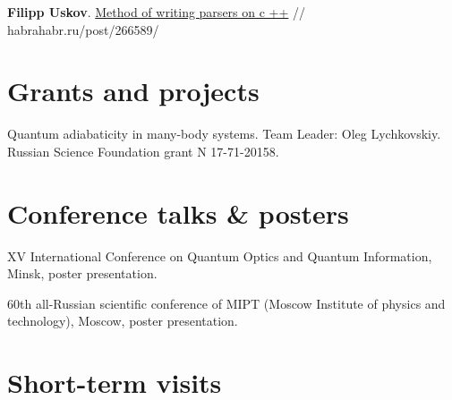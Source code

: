 \documentclass[10pt,a4paper,sans]{moderncv}
\begin{document}
	{\textbf{Filipp Uskov}.
	{\textcolor{blue}{\href{https://habr.com/post/266589/}{ Method of writing parsers on c ++}}} //    habrahabr.ru/post/266589/}

\section{Grants and projects}
	{Quantum adiabaticity in many-body systems. Team Leader: Oleg Lychkovskiy. Russian Science Foundation grant N 17-71-20158.}{}{}{}{}
	
\section{Conference talks \& posters}
	{XV International Conference on Quantum Optics and Quantum Information, Minsk, poster presentation.}{}{}{}{}
	
	{60th all-Russian scientific conference of MIPT (Moscow Institute of physics and technology), Moscow, poster presentation.}{}{}{}{}
	

\section{Short-term visits}

\end{document}
